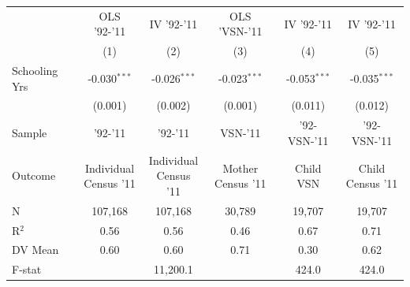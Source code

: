 
\begin{tabular}[t]{lccccc}
\toprule
  & OLS '92-'11 & IV '92-'11 & OLS 'VSN-'11 & IV '92-'11  & IV '92-'11  \\
  & (1) & (2) & (3) & (4) & (5)\\
\midrule
Schooling Yrs & -0.030$^{***}$ & -0.026$^{***}$ & -0.023$^{***}$ & -0.053$^{***}$ & -0.035$^{***}$\\
 & (0.001) & (0.002) & (0.001) & (0.011) & (0.012)\\
\midrule
Sample & '92-'11 & '92-'11 & VSN-'11 & '92-VSN-'11 & '92-VSN-'11 \\
Outcome & \makecell{Individual\\Census '11} & \makecell{Individual\\Census '11} & \makecell{Mother\\Census '11} & \makecell{Child\\VSN} & \makecell{Child\\Census '11} \\
\midrule
N & 107,168 & 107,168 & 30,789 & 19,707 & 19,707\\
R$^2$ & 0.56 & 0.56 & 0.46 & 0.67 & 0.71\\
DV Mean & 0.60 & 0.60 & 0.71 & 0.30 & 0.62\\
F-stat &  & 11,200.1 &  & 424.0 & 424.0\\
\bottomrule
\end{tabular}
